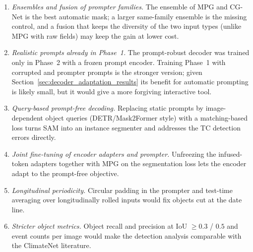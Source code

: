 \begin{enumerate}
  \item \emph{Ensembles and fusion of prompter families.} The ensemble of MPG and CG-Net is the best automatic mask;
  a larger same-family ensemble is the missing control, and a fusion that keeps the diversity of the two input types
  (unlike MPG with raw fields) may keep the gain at lower cost.
  \item \emph{Realistic prompts already in Phase~1.} The prompt-robust decoder was trained only in Phase~2 with a frozen
  prompt encoder. Training Phase~1 with corrupted and prompter prompts is the stronger version; given
  Section~\ref{sec:decoder_adaptation_results} its benefit for automatic prompting is likely small, but it would give a
  more forgiving interactive tool.
  \item \emph{Query-based prompt-free decoding.} Replacing static prompts by image-dependent object queries
  (DETR/Mask2Former style) with a matching-based loss turns SAM into an instance segmenter and addresses the TC detection
  errors directly.
  \item \emph{Joint fine-tuning of encoder adapters and prompter.} Unfreezing the infused-token adapters together with
  MPG on the segmentation loss lets the encoder adapt to the prompt-free objective.
  \item \emph{Longitudinal periodicity.} Circular padding in the prompter and test-time averaging over longitudinally
  rolled inputs would fix objects cut at the date line.
  \item \emph{Stricter object metrics.} Object recall and precision at IoU $\ge 0.3$ / $0.5$ and event counts per image
  would make the detection analysis comparable with the ClimateNet literature.
\end{enumerate}

